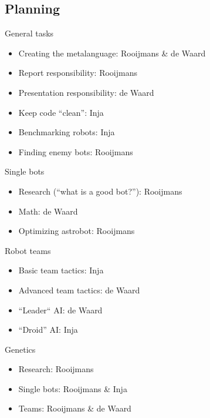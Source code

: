 \documentclass{beamer}
\newcommand{\itemslide}[2]
{
\begin{frame}
\begin{block}{#1} 
\begin{itemize}

#2

\end{itemize}
\end{block} 
\end{frame}
}
\begin{document}
\subsection{Planning}


\itemslide{General tasks}{
 \item Creating the metalanguage: Rooijmans \& de Waard %
 \item Report responsibility: Rooijmans
 \item Presentation responsibility: de Waard
 \item Keep code ``clean'': Inja
 \item Benchmarking robots: Inja
 \item Finding enemy bots: Rooijmans
}

%    

\itemslide{Single bots}{
\item Research (``what is a good bot?''): Rooijmans
\item Math: de Waard
\item Optimizing astrobot: Rooijmans   %
}
%

\itemslide{Robot teams}{
\item Basic team tactics: Inja
\item Advanced team tactics: de Waard
\item ``Leader`` AI: de Waard
\item ``Droid'' AI: Inja
}
%
\itemslide{Genetics}{
\item Research: Rooijmans
\item Single bots: Rooijmans \& Inja
\item Teams: Rooijmans \& de Waard
}
\end{document}
